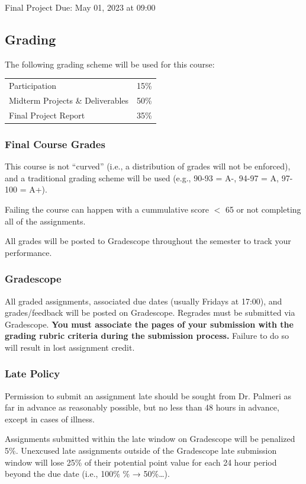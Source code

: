 \documentclass[10pt]{report}
\begin{document}
Final Project Due: May 01, 2023 at 09:00

\subsection*{Grading} 
The following grading scheme will be used for this course:

\begin{center}
\begin{tabular}{ll}
Participation                     & 15\% \\
Midterm Projects \& Deliverables  & 50\% \\
Final Project Report              & 35\% \\
\end{tabular}
\end{center}

\subsubsection*{Final Course Grades}
This course is not ``curved'' (i.e., a distribution of grades will not be
enforced), and a traditional grading scheme will be used (e.g., 90-93 = A-,
94-97 = A, 97-100 = A+).

Failing the course can happen with a cummulative score $<$ 65 or not completing
all of the assignments.

All grades will be posted to Gradescope throughout the semester to track your performance.

\subsubsection{Gradescope}
All graded assignments, associated due dates (usually Fridays at 17:00), and
grades/feedback will be posted on Gradescope.  Regrades must be submitted via
Gradescope. \textbf{You must associate the pages of your submission with the
grading rubric criteria during the submission process.}  Failure to do so will
result in lost assignment credit.

\subsubsection*{Late Policy}
Permission to submit an assignment late should be sought from Dr. Palmeri as
far in advance as reasonably possible, but no less than 48 hours in advance,
except in cases of illness.

Assignments submitted within the late window on Gradescope will be penalized
5\%. Unexcused late assignments outside of the Gradescope late submission
window will lose 25\% of their potential point value for each 24 hour period
beyond the due date (i.e., 100\% \% → 50\%\ldots).
\end{document}
